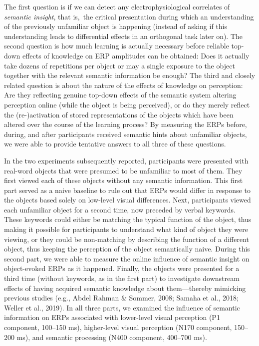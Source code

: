 \documentclass[
  english,
  doc,12pt,twoside,floatsintext]{apa7}
\begin{document}
The first question is if we can detect any electrophysiological correlates of \emph{semantic insight}, that is,~the critical presentation during which an understanding of the previously unfamiliar object is happening (instead of asking if this understanding leads to differential effects in an orthogonal task later on). The second question is how much learning is actually necessary before reliable top-down effects of knowledge on ERP amplitudes can be obtained: Does it actually take dozens of repetitions per object or may a single exposure to the object together with the relevant semantic information be enough? The third and closely related question is about the nature of the effects of knowledge on perception: Are they reflecting genuine top-down effects of the semantic system altering perception online (while the object is being perceived), or do they merely reflect the (re-)activation of stored representations of the objects which have been altered over the course of the learning process? By measuring the ERPs before, during, and after participants received semantic hints about unfamiliar objects, we were able to provide tentative answers to all three of these questions.

In the two experiments subsequently reported, participants were presented with real-word objects that were presumed to be unfamiliar to most of them. They first viewed each of these objects without any semantic information. This first part served as a naive baseline to rule out that ERPs would differ in response to the objects based solely on low-level visual differences. Next, participants viewed each unfamiliar object for a second time, now preceded by verbal keywords. These keywords could either be matching the typical function of the object, thus making it possible for participants to understand what kind of object they were viewing, or they could be non-matching by describing the function of a different object, thus keeping the perception of the object semantically naive. During this second part, we were able to measure the online influence of semantic insight on object-evoked ERPs as it happened. Finally, the objects were presented for a third time (without keywords, as in the first part) to investigate downstream effects of having acquired semantic knowledge about them---thereby mimicking previous studies (e.g., Abdel Rahman \& Sommer, 2008; Samaha et al., 2018; Weller et al., 2019). In all three parts, we examined the influence of semantic information on ERPs associated with lower-level visual perception (P1 component, 100--150 ms), higher-level visual perception (N170 component, 150--200 ms), and semantic processing (N400 component, 400--700 ms).
\end{document}
